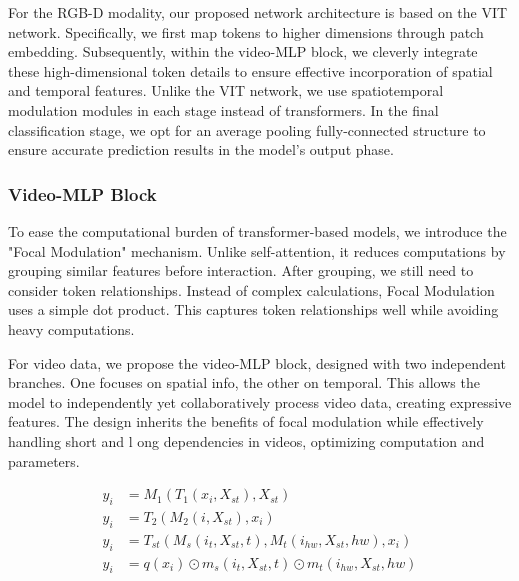 \documentclass[conference,a4paper,english]{IEEEtran}[2015/08/26]
\begin{document}




For the RGB-D modality, our proposed network architecture is based on the VIT network. 
Specifically, we first map tokens to higher dimensions through patch embedding. 
Subsequently, within the video-MLP block, we cleverly integrate these high-dimensional token details 
to ensure effective incorporation of spatial and temporal features. Unlike the VIT network, 
we use spatiotemporal modulation modules in each stage instead of transformers. 
In the final classification stage, we opt for an average pooling 
fully-connected structure to ensure accurate prediction results in the model's output phase.
\subsubsection{Video-MLP Block}

To ease the computational burden of transformer-based models, 
we introduce the "Focal Modulation" mechanism. Unlike self-attention, 
it reduces computations by grouping similar features before interaction. After grouping, 
we still need to consider token relationships. Instead of complex calculations, 
Focal Modulation uses a simple dot product. 
This captures token relationships well while avoiding heavy computations.

For video data, we propose the video-MLP block, designed with two independent branches.
 One focuses on spatial info, the other on temporal. 
 This allows the model to independently yet collaboratively process video data, 
 creating expressive features. 
 The design inherits the benefits of focal modulation while effectively handling short and l
 ong dependencies in videos, optimizing computation and parameters.

\begin{align*}
y_i &= M_1(T_1(x_i, X_{st}), X_{st}) \tag{5}\\
y_i &= T_2(M_2(i, X_{st}), x_i) \tag{6}\\
y_i &= T_{st}(M_s(i_t, X_{st}, t), M_t(i_{hw}, X_{st}, hw), x_i) \tag{7}\\
y_i &= q(x_i) \odot m_s(i_t, X_{st}, t) \odot m_t(i_{hw}, X_{st}, hw) \tag{8}
\end{align*}
\end{document}
